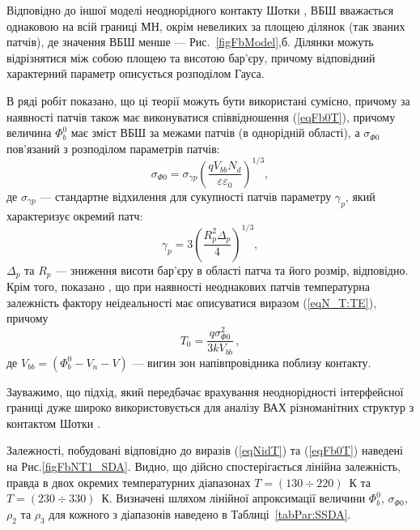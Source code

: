 Відповідно до іншої моделі неоднорідного контакту Шотки \cite{Sullivan,Tung:PhysRev,Tung:MSE,Tung:ApplPhysRev}, ВБШ вважається однаковою на всій границі МН,
окрім невеликих за площею ділянок (так званих патчів), де значення ВБШ менше --- Рис.~\ref{figFbModel},б.
Ділянки можуть відрізнятися між собою площею та висотою бар'єру, причому відповідний характерний параметр описується розподілом Гауса.

В ряді робіт \cite{Iucolano2007JAP, Iucolano2007APL} показано, що ці теорії можуть бути використані сумісно,
причому за наявності патчів також має виконуватися співвідношення (\ref{eqFb0T}),
причому величина $\Phi_b^0$ має зміст ВБШ за межами патчів (в однорідній області),
а $\sigma_{\Phi0}$ пов'язаний з розподілом параметрів патчів:
\begin{equation}\label{eqGigFSigG}
  \sigma_{\Phi0}=\sigma_{\gamma p}\left(\frac{qV_{bb}N_d}{\varepsilon\varepsilon_0}\right)^{1/3},
\end{equation}
де
$\sigma_{\gamma p}$ --- стандартне відхилення для сукупності патчів параметру $\gamma_p$, який
характеризує окремий патч:
\begin{equation}\label{eqGammaP}
  \gamma_p=3\left(\frac{R_p^2\Delta_p}{4}\right)^{1/3},
\end{equation}
$\Delta_p$ та $R_p$ --- зниження висоти бар'єру в області патча та його розмір, відповідно.
Крім того, показано \cite{Sullivan,Tung:PhysRev,Iucolano2007JAP, Iucolano2007APL}, що при наявності неоднакових патчів
температурна залежність фактору неідеальності має описуватися виразом (\ref{eqN_T:TE}), причому
\begin{equation} \label{eqN_T0}
T_0=\frac{q\sigma_{\Phi0}^2}{3kV_{bb}}\,,
\end{equation}
де
$V_{bb}=(\Phi_b^0-V_n-V)$ --- вигин зон напівпровідника поблизу контакту.

Зауважимо, що підхід, який передбачає  врахування неоднорідності
інтерфейсної границі дуже широко використовується  для аналізу ВАХ різноманітних структур з контактом Шотки
\cite{Soylu,GELCZUK2014,Mohan,Yildirim2010,JYOTHI2015,DURMUS2014,KHURE2015,OZAVCI2013,Cetin2005,Karatas:2006NIMA,Sarpatwari,
Tascioglu2010, Yildirim2010, Mamor, Iucolano2007JAP, Iucolano2007APL,Li2016}.

Залежності, побудовані відповідно до виразів (\ref{eqNidT}) та (\ref{eqFb0T}) наведені на Рис.\ref{figFbNT1_SDA}.
Видно, що дійсно спостерігається лінійна залежність,
правда в двох окремих температурних діапазонах $T=(130\div220)$~К та $T=(230\div330)$~К.
Визначені шляхом лінійної апроксимації величини $\Phi_{b}^0$, $\sigma_{\Phi0}$, $\rho_2$ та $\rho_3$ для кожного з діапазонів
наведено в Таблиці~\ref{tabPar:SSDA}.

